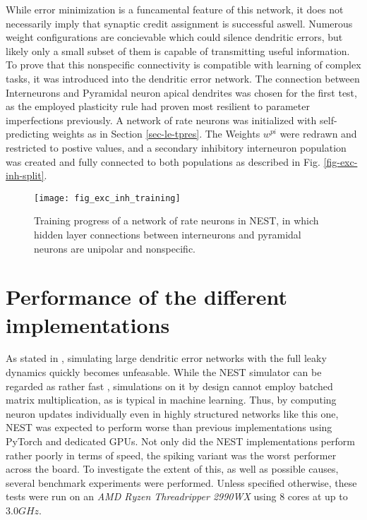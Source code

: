 While error minimization is a funcamental feature of this network, it does not necessarily imply that synaptic credit
assignment is successful aswell. Numerous weight configurations are concievable which could silence dendritic errors,
but likely only a small subset of them is capable of transmitting useful information. To prove that this nonspecific
connectivity is compatible with learning of complex tasks, it was introduced into the dendritic error network. The
connection between Interneurons and Pyramidal neuron apical dendrites was chosen for the first test, as the employed
plasticity rule had proven most resilient to parameter imperfections previously. A network of rate neurons was
initialized with self-predicting weights as in Section \ref{sec-le-tpres}. The Weights $w^{pi}$ were redrawn and
restricted to postive values, and a secondary inhibitory interneuron population was created and fully connected to both
populations as described in Fig. \ref{fig-exc-inh-split}.


\begin{figure}[t]
    \centering
    \texttt{[image: fig\_exc\_inh\_training]}
    \caption{Training progress of a network of rate neurons in NEST, in which hidden layer connections between
        interneurons and pyramidal neurons are unipolar and nonspecific.}
    \label{fig-exc-inh-training}
\end{figure}





\section{Performance of the different implementations}\label{sec-benchmark}

As stated in \cite{Haider2021}, simulating large dendritic error networks with the full leaky dynamics quickly becomes
unfeasable. While the NEST simulator can be regarded as rather fast \citep{albada2018performance}, simulations on it by
design cannot employ batched matrix multiplication, as is typical in machine learning. Thus, by computing neuron updates
individually even in highly structured networks like this one, NEST was expected to perform worse than previous
implementations using PyTorch and dedicated GPUs. Not only did the NEST implementations perform rather poorly in terms
of speed, the spiking variant was the worst performer across the board. To investigate the extent of this, as well as
possible causes, several benchmark experiments were performed. Unless specified otherwise, these tests were run on
an \textit{AMD Ryzen Threadripper 2990WX} using 8 cores at up to $3.0GHz$.


